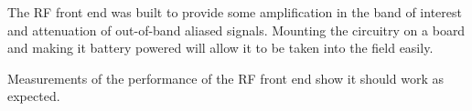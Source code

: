 The RF front end was built to provide some amplification in the band of interest and attenuation of out-of-band aliased signals. Mounting the circuitry on a board and making it battery powered will allow it to be taken into the field easily.

Measurements of the performance of the RF front end show it should work as expected.
